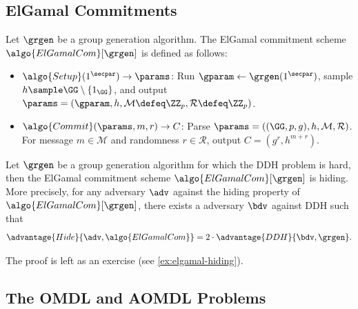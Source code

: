 \subsection{ElGamal Commitments}

\begin{definition}
  Let $\grgen$ be a group generation algorithm.
  The ElGamal commitment scheme $\algo{ElGamalCom}[\grgen]$ is defined as follows:
  \begin{itemize}
  \item $\algo{Setup}(1^\secpar) \rightarrow \params$: Run $\gparam \gets \grgen(1^\secpar)$, sample $h \sample \GG \setminus \{1_\GG\}$, and output $\params = (\gparam, h, \mathcal{M} \defeq \ZZ_p, \mathcal{R} \defeq \ZZ_p)$.
  \item $\algo{Commit}(\params, m, r) \rightarrow C$: Parse $\params = ((\GG, p, g), h, \mathcal{M}, \mathcal{R})$. For message $m \in \mathcal{M}$ and randomness $r \in \mathcal{R}$, output $C = (g^r, h^{m+r})$.
  \end{itemize}
\end{definition}

\begin{theorem}\label{thm:elgamal-hiding}
  Let $\grgen$ be a group generation algorithm for which the DDH problem is hard, then the ElGamal commitment scheme $\algo{ElGamalCom}[\grgen]$ is hiding.
  More precisely, for any \ppt adversary $\adv$ against the hiding property of $\algo{ElGamalCom}[\grgen]$, there exists a \ppt adversary $\bdv$ against DDH such that
  \[
  \advantage{Hide}{\adv, \algo{ElGamalCom}} = 2 \cdot \advantage{DDH}{\bdv, \grgen}.
  \]
\end{theorem}

The proof is left as an exercise (see \autoref{ex:elgamal-hiding}).

\subsection{The OMDL and AOMDL Problems}

